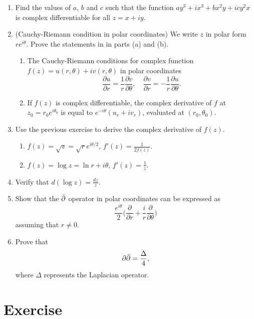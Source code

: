 \begin{enumerate}
\item Find the values of $a$, $b$ and $c$ such that the function $ay^3+ix^3 + bx^2y + icy^2x$ is complex differentiable for all $z=x+iy$.

\item (Cauchy-Riemann condition in polar coordinates)
We write $z$ in polar form $re^{i\theta}$.
Prove the statements in in parts (a) and (b).
\begin{enumerate}
\item The Cauchy-Riemann conditions for complex function $f(z) = u(r,\theta) + i v(r,\theta)$ in polar coordinates
$$
\frac{\partial u}{\partial r} = \frac{1}{r}\frac{\partial v}{\partial \theta}, \quad 
\frac{\partial v}{\partial r} = - \frac{1}{r} \frac{\partial u}{\partial \theta}.
$$

\item If $f(z)$ is complex differentiable, the complex derivative of $f$ at $z_0=r_0e^{i\theta_0}$ is equal to $e^{-i\theta}(u_r+iv_r)$, evaluated at $(r_0,\theta_0)$.
\end{enumerate}

\item Use the previous exercise to derive the complex derivative of $f(z)$.
\begin{enumerate}
\item $f(z) = \sqrt{z} = \sqrt{r} e^{i\theta/2}$, $f'(z) = \frac{1}{2f(z)}$.
\item $f(z) = \log z = \ln r + i \theta$, $f'(z) = \frac{1}{z}$.
\end{enumerate}


\item Verify that $d(\log z) = \frac{dz}{z}$.

\item  Show that the $\bar{\partial}$ operator in polar coordinates can be expressed as
$$
\frac{e^{i\theta}}{2} \Big( \frac{\partial}{\partial r} + \frac{i}{r} \frac{\partial}{\partial\theta} \Big) 
$$
assuming that $r\neq 0$.

\item  Prove that $$\partial \bar{\partial}= \frac{\Delta}{4},
$$
where $\Delta$ represents the Laplacian operator.

\end{enumerate}







\renewcommand{\labelenumi}{\arabic{enumi}.}
\section*{Exercise}

